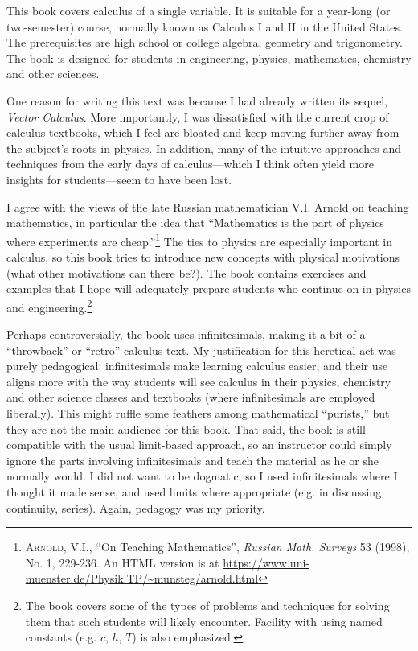 This book covers calculus of a single variable. It is suitable for a year-long
(or two-semester) course, normally known as Calculus I and II in the United
States. The prerequisites are high school or college algebra, geometry and
trigonometry. The book is designed for students in engineering, physics,
mathematics, chemistry and other sciences.

One reason for writing this text was because I had already written its sequel,
\emph{Vector Calculus}. More importantly, I was dissatisfied with the current
crop of calculus
textbooks, which I feel are bloated and keep moving further away from the
subject's roots in physics. In addition, many of the intuitive
approaches and techniques from the early days of calculus---which I think often
yield more insights for students---seem to have been lost.

I agree with the views of the late
Russian mathematician V.I. Arnold on teaching mathematics, in particular the
idea that ``Mathematics is the part of physics where experiments are
cheap.''\footnote{\textsc{Arnold, V.I.},  ``On Teaching Mathematics'',
\emph{Russian Math. Surveys} 53 (1998), No. 1, 229-236. An HTML version is at
\url{https://www.uni-muenster.de/Physik.TP/~munsteg/arnold.html}}
The ties to physics are especially important in calculus, so this book tries to
introduce new concepts with physical motivations (what other motivations
can there be?). The book contains exercises and
examples that I hope will adequately prepare students who continue on in physics
and engineering.\footnote{The book covers some of the types of problems and
techniques for solving them that such students will likely encounter. Facility
with using named constants (e.g. $c$, $h$, $T$) is also emphasized.}

Perhaps controversially, the book uses infinitesimals, making it a
bit of a ``throwback'' or ``retro'' calculus text. My justification for this
heretical act was purely pedagogical: infinitesimals make learning calculus
easier, and their use aligns more with the way students will see calculus
in their physics, chemistry and other science classes and textbooks (where
infinitesimals are employed liberally). This might ruffle some feathers among
mathematical ``purists,'' but they are not the main audience for this book. That
said, the book is still compatible with the usual limit-based approach, so
an instructor could simply ignore the parts involving infinitesimals and teach
the material as he or she normally would. I did not want to be dogmatic, so I
used infinitesimals where I thought it made sense, and used limits where
appropriate (e.g. in discussing continuity, series). Again, pedagogy was my
priority.

